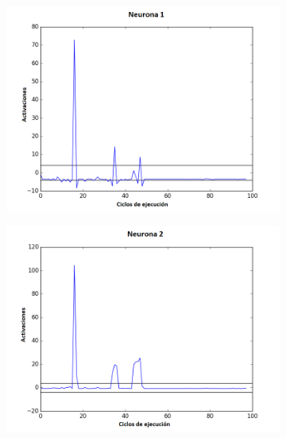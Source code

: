 \begin{figure}[!h]
    \centering %
\begin{subfigure}{0.33\textwidth}
  \includegraphics[width=\linewidth]{Imagenes/Agente1Activaciones/Agente4/Neurona0}
\end{subfigure}\hfil %
\begin{subfigure}{0.33\textwidth}
  \includegraphics[width=\linewidth]{Imagenes/Agente1Activaciones/Agente4/Neurona1}
\end{subfigure}\hfil %
\begin{subfigure}{0.33\textwidth}

\end{subfigure}
\end{figure}
